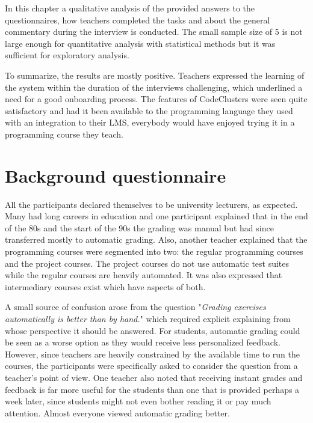 In this chapter a qualitative analysis of the provided answers to the questionnaires, how teachers completed the tasks and about the general commentary during the interview is conducted. The small sample size of 5 is not large enough for quantitative analysis with statistical methods but it was sufficient for exploratory analysis.

To summarize, the results are mostly positive. Teachers expressed the learning of the system within the duration of the interviews challenging, which underlined a need for a good onboarding process. The features of CodeClusters were seen quite satisfactory and had it been available to the programming language they used with an integration to their LMS, everybody would have enjoyed trying it in a programming course they teach.

\section{Background questionnaire}

All the participants declared themselves to be university lecturers, as expected. Many had long careers in education and one participant explained that in the end of the 80s and the start of the 90s the grading was manual but had since transferred mostly to automatic grading. Also, another teacher explained that the programming courses were segmented into two: the regular programming courses and the project courses. The project courses do not use automatic test suites while the regular courses are heavily automated. It was also expressed that intermediary courses exist which have aspects of both.

A small source of confusion arose from the question "\textit{Grading exercises automatically is better than by hand.}" which required explicit explaining from whose perspective it should be answered. For students, automatic grading could be seen as a worse option as they would receive less personalized feedback. However, since teachers are heavily constrained by the available time to run the courses, the participants were specifically asked to consider the question from a teacher's point of view. One teacher also noted that receiving instant grades and feedback is far more useful for the students than one that is provided perhaps a week later, since students might not even bother reading it or pay much attention. Almost everyone viewed automatic grading better.

